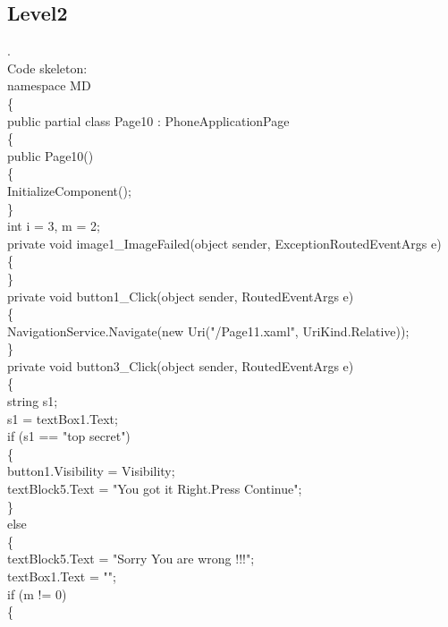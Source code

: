 {{\subsection{Level2}
\ttfamily \hspace{1cm}\cite{DBLP:journals/ivc/KadyrovP03}.\\
\rmfamily
Code skeleton:\\
namespace MD\\
\{\\
    public partial class Page10 : PhoneApplicationPage\\
    \{\\
        public Page10()\\
        \{\\
            InitializeComponent();\\
        \}\\
        int i = 3, m = 2;\\
        private void image1_ImageFailed(object sender, ExceptionRoutedEventArgs e)\\
        \{\\
            
        \}\\
        private void button1_Click(object sender, RoutedEventArgs e)\\
        \{\\
            NavigationService.Navigate(new Uri("/Page11.xaml", UriKind.Relative));\\
        \}\\

        private void button3_Click(object sender, RoutedEventArgs e)\\
        \{\\
            string s1;\\
            s1 = textBox1.Text;\\
            if (s1 == "top secret")\\
            \{\\
                button1.Visibility = Visibility;\\
                textBlock5.Text = "You got it Right.Press Continue";\\
            \}\\
            else\\
            \{\\                textBlock5.Text = "Sorry You are wrong !!!";\\
                textBox1.Text = "";\\
                if (m != 0)\\
                \{\\

}}
